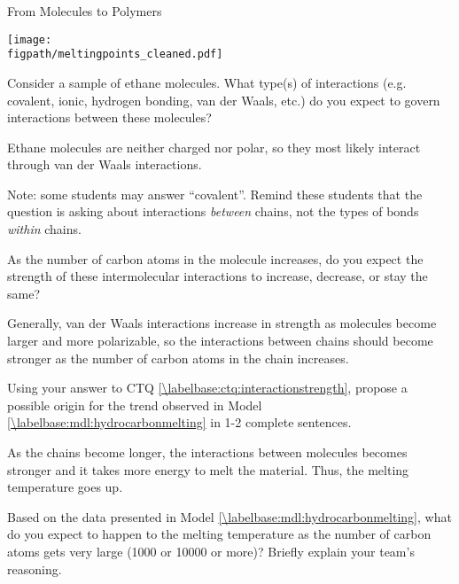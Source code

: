 \begin{activity}{From Molecules to Polymers}
\begin{model}
	\centerline{\texttt{[image: \\figpath/meltingpoints\_cleaned.pdf]}}
	
	\vspace{6pt}

\end{model}

\begin{ctqs}
	
	\question Consider a sample of ethane molecules.  What type(s) of interactions (e.g. covalent, ionic, hydrogen bonding, van der Waals, etc.) do you expect to govern interactions between these molecules?%
	
		\begin{solution}[0.5in]
			Ethane molecules are neither charged nor polar, so they most likely interact through van der Waals interactions.
			
			Note: some students may answer ``covalent''.  Remind these students that the question is asking about interactions \emph{between} chains, not the types of bonds \emph{within} chains.
		\end{solution}
	
	\question As the number of carbon atoms in the molecule increases, do you expect the strength of these intermolecular interactions to increase, decrease, or stay the same? \label{\labelbase:ctq:interactionstrength}
	
		\begin{solution}[0.5in]
			Generally, van der Waals interactions increase in strength as molecules become larger and more polarizable, so the interactions between chains should become stronger as the number of carbon atoms in the chain increases.
		\end{solution}
	
	\question Using your answer to CTQ \ref{\labelbase:ctq:interactionstrength}, propose a possible origin for the trend observed in Model \ref{\labelbase:mdl:hydrocarbonmelting} in 1-2 complete sentences.
	
		\begin{solution}[1.9in]
			As the chains become longer, the interactions between molecules becomes stronger and it takes more energy to melt the material.  Thus, the melting temperature goes up.
		\end{solution}
	\question Based on the data presented in Model \ref{\labelbase:mdl:hydrocarbonmelting}, what do you expect to happen to the melting temperature as the number of carbon atoms gets very large (1000 or 10000 or more)?  Briefly explain your team's reasoning.
	

\end{ctqs}
\end{activity}
